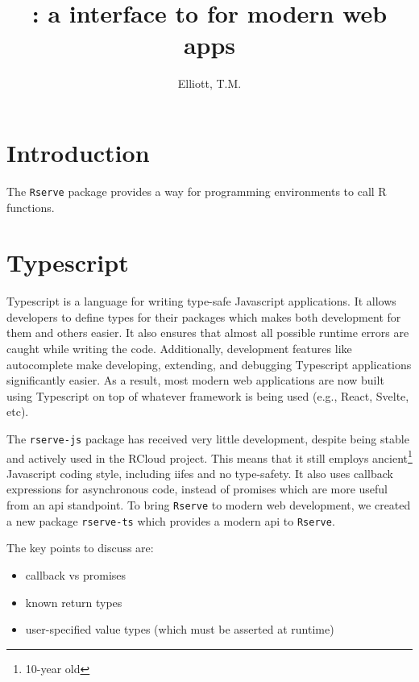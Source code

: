 \documentclass{article}
\title{\pkg{rserve-ts}: a \pkg{TypeScript} interface to \pkg{Rserve} for modern web apps}
\author{Elliott, T.M.}
\affil{iNZight Analytics Ltd}
\affil{University of Auckland}
\date{}
\newcommand{\pkg}[1]{\texttt{#1}}
\newcommand{\prog}[1]{{\sf #1}}
\newcommand{\proglang}[1]{\prog{#1}}
\begin{document}
\maketitle

\begin{abstract}

\end{abstract}

\section{Introduction}
\label{sec:intro}

The \pkg{Rserve} package \parencite{Urbanek2003} provides a way for programming environments to call \proglang{R} functions.

\section{Typescript}
\label{sec:ts}

Typescript is a language for writing type-safe Javascript applications.
It allows developers to define types for their packages which makes both development for them and others easier.
It also ensures that almost all possible runtime errors are caught while writing the code.
Additionally, development features like autocomplete make developing, extending, and debugging Typescript applications significantly easier.
As a result, most modern web applications are now built using Typescript on top of whatever framework is being used (e.g., React, Svelte, etc).

The \pkg{rserve-js} package has received very little development, despite being stable and actively used in the \proglang{RCloud} project.
This means that it still employs ancient\footnote{10-year old} Javascript coding style, including \glspl{iife} and no type-safety.
It also uses callback expressions for asynchronous code, instead of promises which are more useful from an \gls{api} standpoint.
To bring \pkg{Rserve} to modern web development, we created a new package \pkg{rserve-ts} which provides a modern \gls{api} to \pkg{Rserve}.

The key points to discuss are:
\begin{itemize}
    \item callback vs promises
    \item known return types
    \item user-specified value types (which must be asserted at runtime)
\end{itemize}
\end{document}
